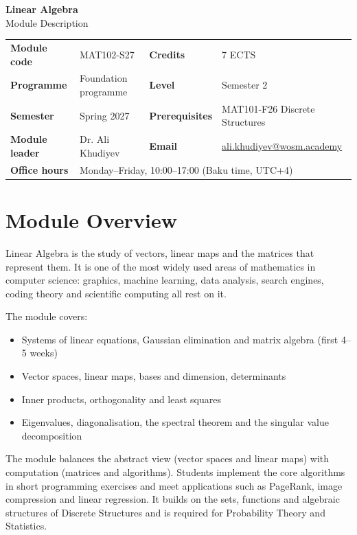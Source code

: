 \documentclass[11pt,a4paper]{article}
\makeatletter
\newcommand{\ModuleTitle}{Linear Algebra}
\newcommand{\ModuleCode}{MAT102-S27}
\newcommand{\Programme}{Foundation programme}
\newcommand{\Level}{Semester 2}
\newcommand{\Semester}{Spring 2027}
\newcommand{\Credits}{7 ECTS}
\newcommand{\ModuleLeader}{Dr. Ali Khudiyev}
\newcommand{\Email}{ali.khudiyev@wosm.academy}
\newcommand{\OfficeHours}{Monday--Friday, 10:00--17:00 (Baku time, UTC+4)}
\newcommand{\Prerequisites}{MAT101-F26 Discrete Structures}
\makeatother
\begin{document}
\begin{center}
  {\LARGE\bfseries\color{accent} \ModuleTitle}\\[4pt]
  {\large Module Description}
\end{center}
\vspace{6pt}

\begin{tabularx}{\textwidth}{>{\bfseries}l X >{\bfseries}l X}
\toprule
Module code   & \ModuleCode    & Credits      & \Credits \\
Programme     & \Programme     & Level        & \Level \\
Semester      & \Semester      & Prerequisites & \Prerequisites \\
Module leader & \ModuleLeader  & Email        & \href{mailto:\Email}{\Email} \\
Office hours  & \multicolumn{3}{l}{\OfficeHours} \\
\bottomrule
\end{tabularx}

\section{Module Overview}
Linear Algebra is the study of vectors, linear maps and the matrices that
represent them. It is one of the most widely used areas of mathematics in computer
science: graphics, machine learning, data analysis, search engines, coding theory
and scientific computing all rest on it.

The module covers:
\begin{itemize}
  \item Systems of linear equations, Gaussian elimination and matrix algebra
        (first 4--5 weeks)
  \item Vector spaces, linear maps, bases and dimension, determinants
  \item Inner products, orthogonality and least squares
  \item Eigenvalues, diagonalisation, the spectral theorem and the singular value
        decomposition
\end{itemize}

The module balances the abstract view (vector spaces and linear maps) with
computation (matrices and algorithms). Students implement the core algorithms in
short programming exercises and meet applications such as PageRank, image
compression and linear regression. It builds on the sets, functions and algebraic
structures of Discrete Structures and is required for Probability Theory and
Statistics.
\end{document}
